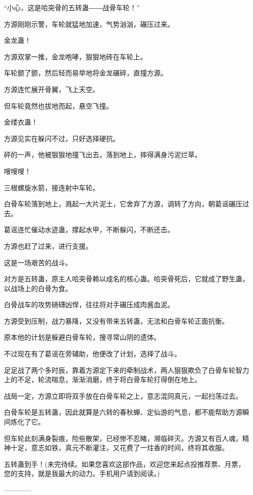 \begin{this_body}
“小心，这是哈突骨的五转蛊――战骨车轮！”

方源刚刚示警，车轮就猛地加速，气势汹汹，碾压过来。

金龙蛊！

方源双掌一推，金龙咆哮，狠狠地砖在车轮上。

车轮颤了颤，然后轻而易举地将金龙碾碎，直撞方源。

方源连忙展开骨翼，飞上天空。

但车轮竟然也拔地而起，悬空飞撞。

金缕衣蛊！

方源见实在躲闪不过，只好选择硬抗。

砰的一声，他被狠狠地撞飞出去，落到地上，摔得满身污泥烂草。

嗖嗖嗖！

三根螺旋水箭，接连射中车轮。

白骨车轮落到地上，溅起一大片泥土，它舍弃了方源，调转了方向，朝葛谣碾压过去。

葛谣连忙催动水迹蛊，撑起水甲，不断躲闪，不断还击。

方源也赶了过来，进行支援。

这是一场艰苦的战斗。

对方是五转蛊，原主人哈突骨赖以成名的核心蛊。哈突骨死后，它就成了野生蛊，以战场上的白骨为食。

白骨战车的攻势磅礴凶悍，往往将对手碾压成肉酱血泥。

方源受到压制，战力暴降，又没有带来五转蛊，无法和白骨车轮正面抗衡。

原本他的计划是躲避白骨车轮，搜寻常山阴的遗体。

不过现在有了葛谣在旁辅助，他便改了计划，选择了战斗。

足足战了两个多时辰，靠着方源定下来的牵制战术，两人狠狠欺负了白骨车轮智力上的不足，轮流喘息，渐渐消磨，终于将白骨车轮打得倒在地上。

战局一定，方源立即将双手放在白骨车轮之上，意志混同真元，一起扫荡过去。

白骨车轮是五转蛊，因此就算是六转的春秋蝉、定仙游的气息，都不能帮助方源瞬间炼化了它。

但车轮此刻满身裂痕，险些散架，已经惨不忍睹，濒临碎灭。方源又有百人魂，精神十足，意志如铁，真元不断灌注，又花费了一炷香的时间，终将其收服。

五转蛊到手！(未完待续。如果您喜欢这部作品，欢迎您来起点投推荐票、月票，您的支持，就是我最大的动力。手机用户请到阅读。)

------------

\end{this_body}

